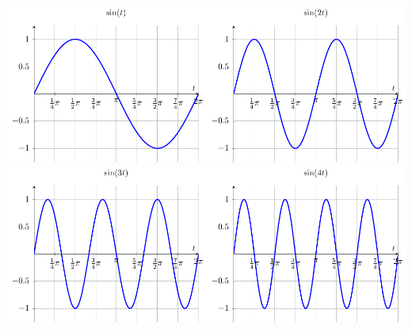 \begin{center}
    \includegraphics[width=0.99\columnwidth]{figures/0-5-fig7.pdf}
    \includegraphics[width=0.99\columnwidth]{figures/0-5-fig7b.pdf}
\end{center}


